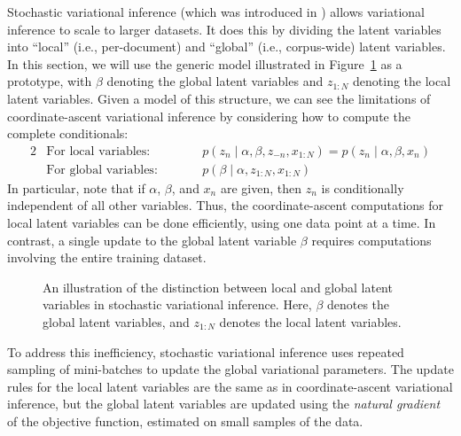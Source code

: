 \documentclass{article}
\begin{document}
Stochastic variational inference (which was introduced in \cite{hoffman2013stochastic}) allows variational inference to scale to larger datasets.
It does this by dividing the latent variables into ``local'' (i.e., per-document) and ``global'' (i.e., corpus-wide) latent variables.
In this section, we will use the generic model illustrated in Figure~\ref{fig:svi-local-global} as a prototype, with $\beta$ denoting the global latent variables and $z_{1:N}$ denoting the local latent variables.
Given a model of this structure, we can see the limitations of coordinate-ascent variational inference by considering how to compute the complete conditionals:
\begin{alignat}{2}
&\text{For local variables:}&\qquad& p(z_n \mid \alpha, \beta, z_{-n}, x_{1:N}) = p(z_n \mid \alpha, \beta, x_n) \\
&\text{For global variables:}&\qquad& p(\beta \mid \alpha, z_{1:N}, x_{1:N})
\end{alignat}
In particular, note that if $\alpha$, $\beta$, and $x_n$ are given, then $z_n$ is conditionally independent of all other variables.
Thus, the coordinate-ascent computations for local latent variables can be done efficiently, using one data point at a time.
In contrast, a single update to the global latent variable $\beta$ requires computations involving the entire training dataset.

\begin{figure}[htb]
%
\centering
{}
%
\caption{An illustration of the distinction between local and global latent variables in stochastic variational inference.  %
Here, $\beta$ denotes the global latent variables, and $z_{1:N}$ denotes the local latent variables.}
\label{fig:svi-local-global}
\end{figure}

To address this inefficiency, stochastic variational inference uses repeated sampling of mini-batches to update the global variational parameters.
The update rules for the local latent variables are the same as in coordinate-ascent variational inference, but the global latent variables are updated using the \emph{natural gradient} of the objective function, estimated on small samples of the data.
\end{document}
